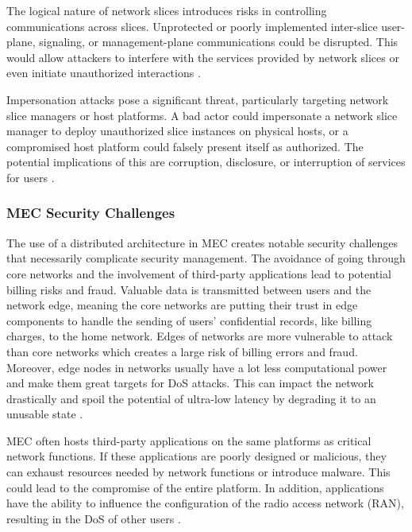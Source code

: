 \documentclass[acmtog]{acmart}
\begin{document}
 The logical nature of network slices introduces risks in controlling communications across slices. Unprotected or poorly implemented inter-slice user-plane, signaling, or management-plane communications could be disrupted. This would allow attackers to interfere with the services provided by network slices or even initiate unauthorized interactions \cite{ref3_2}. 

Impersonation attacks pose a significant threat, particularly targeting network slice managers or host platforms. A bad actor could impersonate a network slice manager to deploy unauthorized slice instances on physical hosts, or a compromised host platform could falsely present itself as authorized. The potential implications of this are corruption, disclosure, or interruption of services for users \cite{ref3_2}.

\subsubsection{MEC Security Challenges}
The use of a distributed architecture in MEC creates notable security challenges that necessarily complicate security management. The avoidance of going through core networks and the involvement of third-party applications lead to potential billing risks and fraud. Valuable data is transmitted between users and the network edge, meaning the core networks are putting their trust in edge components to handle the sending of users' confidential records, like billing charges, to the home network. Edges of networks are more vulnerable to attack than core networks which creates a large risk of billing errors and fraud. Moreover, edge nodes in networks usually have a lot less computational power and make them great targets for DoS attacks. This can impact the network drastically and spoil the potential of ultra-low latency by degrading it to an unusable state \cite{ref3_3}. 

MEC often hosts third-party applications on the same platforms as critical network functions. If these applications are poorly designed or malicious, they can exhaust resources needed by network functions or introduce malware. This could lead to the compromise of the entire platform. In addition, applications have the ability to influence the configuration of the radio access network (RAN), resulting in the DoS of other users \cite{ref3_3}.



\end{document}
